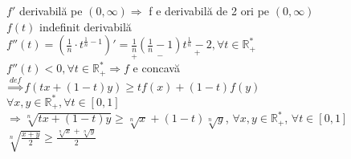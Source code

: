 \documentclass[12pt]{extarticle}
\begin{document}
{    $f'$ derivabilă pe $(0, \infty) \Rightarrow$ f e derivabilă de 2 ori pe $(0, \infty)$ \\
    $f(t)$ indefinit derivabilă \\
    $f''(t) = (\frac{1}{n} \cdot t^{\frac{1}{n} - 1})' = \underset{+}{\frac{1}{n}}\underset{-}{(\frac{1}{n} - 1)}\underset{+}{t^{\frac{1}{n}} - 2}, \forall t \in \mathbb{R}_{+}^{*}$ \\
    $f''(t) < 0, \forall t \in \mathbb{R}_{+}^{*} \Rightarrow f$ e concavă \\
    $\overset{def}{\Rightarrow} f(tx + (1 - t)y) \geq tf(x) + (1 - t)f(y)$ \\
    $\forall x, y \in \mathbb{R}_{+}^{*}, \forall t \in [0, 1]$ \\
    $\Rightarrow \sqrt[n]{tx + (1 - t)y} \geq \sqrt[n]{x} + (1 - t)\sqrt[n]{y}$, $\forall x, y \in \mathbb{R}_{+}^{*}$, $\forall t \in [0, 1]$ \\
    $\sqrt[n]{\frac{x + y}{2}} \geq \frac{\sqrt[n]{x} + \sqrt[n]{y}}{2}$ \\
    \\
	}
	
	
\end{document}
